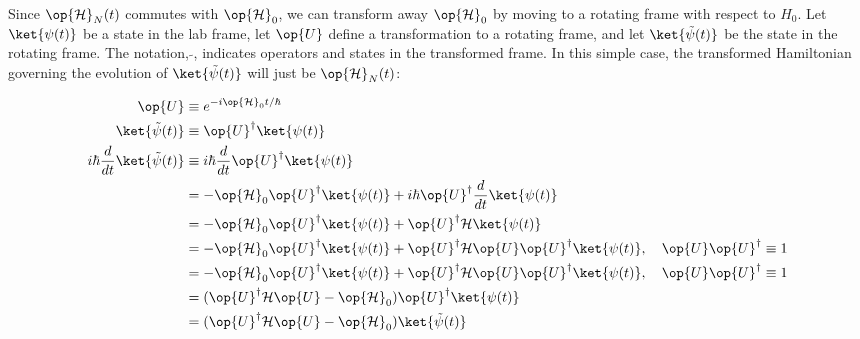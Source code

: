 Since $\op{\mathcal{H}}_{N}(t)$ commutes with $\op{\mathcal{H}}_0$, we can transform away $\op{\mathcal{H}}_0$ by moving to a rotating frame with respect to $H_0$. Let $\ket{\psi (t)}$ be a state in the lab frame, let $\op{U}$ define a transformation to a rotating frame, and let $\ket{\tilde{\psi} (t)}$ be the state in the rotating frame. The notation, $\tilde{}$, indicates operators and states in the transformed frame. In this simple case, the transformed Hamiltonian governing the evolution of $\ket{\tilde{\psi} (t)}$ will just be $\op{\mathcal{H}}_{N}(t)$:

\begin{align}
\op{U} &\equiv e^{-i\op{\mathcal{H}}_0 t / \hbar } \\
\ket{\tilde{\psi} (t)} &\equiv \op{U}^\dagger \ket{\psi (t)} \\
i \hbar \frac{d}{dt} \ket{\tilde{\psi} (t)} & \equiv i \hbar \frac{d}{dt} \op{U}^\dagger \ket{\psi (t)} \\
&= -\op{\mathcal{H}}_0 \op{U}^\dagger \ket{\psi (t)} + i\hbar \op{U}^\dagger \frac{d}{dt} \ket{\psi (t)} \\
&= -\op{\mathcal{H}}_0 \op{U}^\dagger \ket{\psi (t)} + \op{U}^\dagger \mathcal{H}  \ket{\psi (t)} \\
&= -\op{\mathcal{H}}_0 \op{U}^\dagger \ket{\psi (t)} + \op{U}^\dagger \mathcal{H} \op{U} \op{U}^\dagger \ket{\psi (t)}, \quad \op{U}\op{U}^\dagger \equiv 1 \\
&= -\op{\mathcal{H}}_0 \op{U}^\dagger \ket{\psi (t)} + \op{U}^\dagger \mathcal{H} \op{U} \op{U}^\dagger \ket{\psi (t)}, \quad \op{U}\op{U}^\dagger \equiv 1 \\
 &=  ( \op{U}^\dagger \mathcal{H} \op{U} -\op{\mathcal{H}}_0  ) \op{U}^\dagger \ket{\psi (t)} \\
& =  ( \op{U}^\dagger \mathcal{H} \op{U} -\op{\mathcal{H}}_0  ) \ket{\tilde{\psi} (t)}
\end{align}

